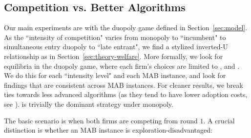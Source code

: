 \documentclass[../competing_bandits_with_appendix.tex]{subfiles}
\begin{document}
\subsection{Competition vs. Better Algorithms}\label{sec:competition}

Our main experiments are with the duopoly game defined in Section~\ref{sec:model}. As the ``intensity of competition" varies from  monopoly to ``incumbent" to simultaneous entry duopoly to ``late entrant", we find a stylized inverted-U relationship as in Section~\ref{sec:theory-welfare}. More formally, we look for equilibria in the duopoly game, where each firm's choices are limited to \DynamicGreedy, \DynamicEpsGreedy and \Thompson. We do this for each ``intensity level" and each MAB instance, and look for findings that are consistent across MAB instances. For cleaner results, we break ties towards less advanced algorithms (as they tend to have lower adoption costs, see \cite{DS-arxiv}). \DynamicGreedy is trivially the dominant strategy under monopoly.


The basic scenario is when both firms are competing from round $1$. A crucial distinction is whether an MAB instance is exploration-disadvantaged:

\end{document}
